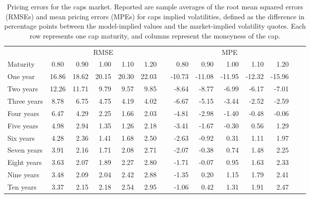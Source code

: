 \documentclass[11pt,a4paper,english,oneside]{book}
\numberwithin{equation}{chapter}
\begin{document}
\begin{table}[htbp!]
\caption[Pricing Errors for the Caps Market]{ Pricing errors for the caps market. \label{Table2} \newline
Reported are sample averages of the root mean squared errors (RMSEs) and mean pricing
errors (MPEs) for caps implied volatilities, defined as the difference in percentage points between the model-implied values and the market-implied volatility quotes.
Each row represents one cap maturity, and columns represent the moneyness of the cap.}
\setlength{\tabcolsep}{6pt}
\vspace{0.2cm}
\begin{tabular}{@{}lcrrrrrrrrrrrr@{}}
\toprule & \multicolumn{5}{c}{RMSE}
&& \multicolumn{5}{c}{MPE} \\
 \cmidrule(r){2-6}  \cmidrule(r){8-12}
{Maturity}  & 0.80 & 0.90 & 1.00 & 1.10 & 1.20 && 0.80 & 0.90 & 1.00 & 1.10 & 1.20 \\
\midrule
One year  & 16.86   &   18.62   &   20.15   &  20.30   &  22.03 & &  -10.73  & -11.08  & -11.95   &-12.32  &-15.96      \\
Two years  & 12.26   &   11.71   &    9.79   &   9.57   &   9.85 & &   -8.64  &  -8.77  &  -6.99   & -6.17  & -7.01      \\
Three years  &  8.78   &    6.75   &    4.75   &   4.19   &   4.02 & &   -6.67  &  -5.15  &  -3.44   & -2.52  & -2.59      \\
Four years  &  6.47   &    4.29   &    2.25   &   1.66   &   2.03 & &   -4.81  &  -2.98  &  -1.40   & -0.48  & -0.06      \\
Five years  &  4.98   &    2.94   &    1.35   &   1.26   &   2.18 & &   -3.41  &  -1.67  &  -0.30   &  0.56  &  1.29       \\
Six years  &  4.28   &    2.36   &    1.41   &   1.68   &   2.50 & &   -2.63  &  -0.92  &   0.31   &  1.11  &  1.97      \\
Seven years  &  3.91   &    2.16   &    1.71   &   2.08   &   2.71 & &   -2.07  &  -0.38  &   0.74   &  1.48  &  2.25      \\
Eight years  &  3.63   &    2.07   &    1.89   &   2.27   &   2.80 & &   -1.71  &  -0.07  &   0.95   &  1.63  &  2.33      \\
Nine years  &  3.48   &    2.09   &    2.04   &   2.42   &   2.88 & &   -1.35  &   0.20  &   1.15   &  1.79  &  2.41      \\
Ten years &  3.37   &    2.15   &    2.18   &   2.54   &   2.95 & &   -1.06  &   0.42  &   1.31   &  1.91  &  2.47      \\
\bottomrule
\end{tabular}\\
\end{table}
\end{document}
